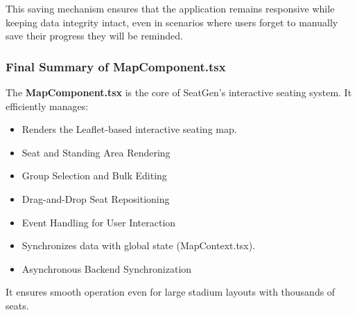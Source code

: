 This saving mechanism ensures that the application remains responsive while keeping data integrity intact, even in scenarios where users forget to manually save their progress they will be reminded.

\subsubsection{Final Summary of MapComponent.tsx}
The \textbf{MapComponent.tsx} is the core of SeatGen’s interactive seating system. It efficiently manages:
\begin{itemize}
    \item Renders the Leaflet-based interactive seating map.
    \item Seat and Standing Area Rendering
    \item Group Selection and Bulk Editing
    \item Drag-and-Drop Seat Repositioning
    \item Event Handling for User Interaction
    \item Synchronizes data with global state (MapContext.tsx).
    \item Asynchronous Backend Synchronization
\end{itemize}

It ensures smooth operation even for large stadium layouts with thousands of seats.

